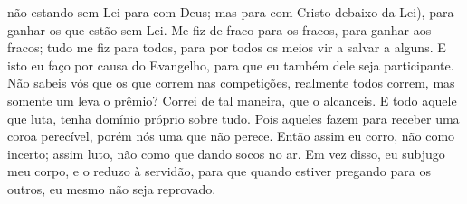 {{} não estando sem Lei para com Deus; mas para com Cristo debaixo da Lei), para ganhar os que estão sem Lei.
Me fiz de fraco para os fracos, para ganhar aos fracos; tudo me fiz para todos, para por todos os meios vir a salvar a alguns.
E isto eu faço por causa do Evangelho, para que eu também dele seja participante.
Não sabeis vós que os que correm nas competições, realmente todos correm, mas somente um leva o prêmio? Correi de tal maneira, que o alcanceis.
E todo aquele que luta, tenha domínio próprio sobre tudo. Pois aqueles fazem para receber uma coroa perecível, porém nós
{} uma que não perece.
Então assim eu corro, não como
{} incerto; assim luto, não como que dando socos no ar.
Em vez disso, eu subjugo meu corpo, e o reduzo à servidão, para que quando estiver pregando para os outros, eu mesmo não seja reprovado.

}
